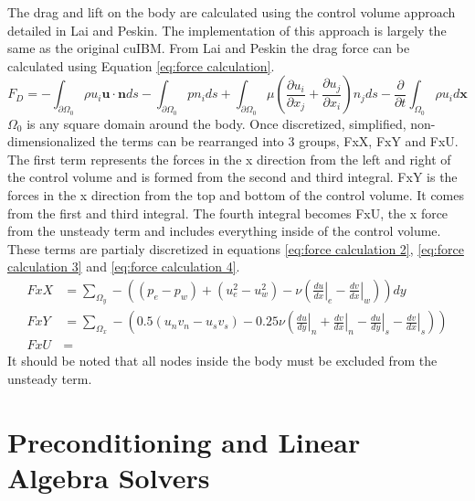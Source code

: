 \documentclass[onehalf,11pt]{beavtex}
\begin{document}
The drag and lift on the body are calculated using the control volume approach detailed in Lai and Peskin\cite{lai2000immersed}.
The implementation of this approach is largely the same as the original cuIBM.
From Lai and Peskin the drag force can be calculated using Equation \ref{eq:force calculation}.
\begin{equation}\label{eq:force calculation}
F_D=-\int_{\partial \Omega_0} \rho u_i\textbf{u}\cdot \textbf{n}ds- \int_{\partial \Omega_0}pn_ids+\int_{\partial \Omega_0}\mu \left(\frac{\partial u_i}{\partial x_j}+\frac{\partial u_j}{\partial x_i}\right)n_jds-\frac{\partial}{\partial t}\int_{\Omega_0}\rho u_i d\textbf{x}
\end{equation}
$\Omega_0$ is any square domain around the body.
Once discretized, simplified, non-dimensionalized the terms can be rearranged into 3 groups, FxX, FxY and FxU.
The first term represents the forces in the x direction from the left and right of the control volume and is formed from the second and third integral.
FxY is the forces in the x direction from the top and bottom of the control volume.
It comes from the first and third integral.
The fourth integral becomes FxU, the x force from the unsteady term and includes everything inside of the control volume.
These terms are partialy discretized in equations \eqref{eq:force calculation 2}, \eqref{eq:force calculation 3} and \eqref{eq:force calculation 4}. 
\begin{align}
FxX &=\sum_{\Omega_y}-\left((p_e-p_w)+(u_e^2-u_w^2)-\nu\left(\left.\frac{du}{dx}\right|_e-\left.\frac{dv}{dx}\right|_w\right)\right)dy\label{eq:force calculation 2}\\
FxY &=\sum_{\Omega_x}-\left(0.5(u_nv_n-u_sv_s)-0.25\nu \left(\left.\frac{du}{dy}\right|_n+\left.\frac{dv}{dx}\right|_n-\left.\frac{du}{dy}\right|_s-\left.\frac{dv}{dx}\right|_s
\right)
\right)
\label{eq:force calculation 3}\\
FxU &=\;\label{eq:force calculation 4}
\end{align}
It should be noted that all nodes inside the body must be excluded from the unsteady term.

\section{Preconditioning and Linear Algebra Solvers}
\label{Preconditioning and Linear Algebra Solvers}
\end{document}
